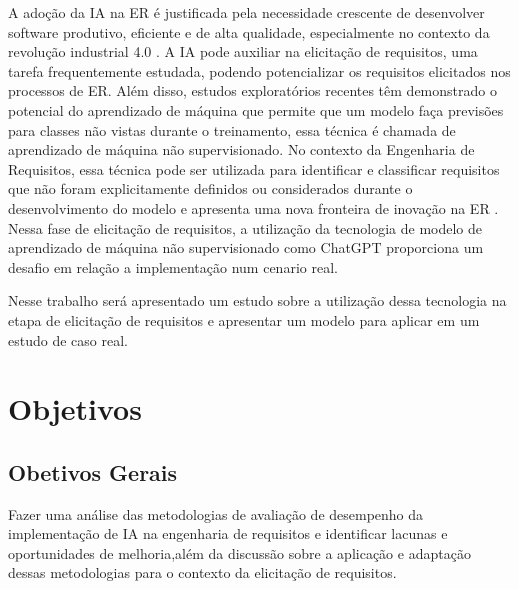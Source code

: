 A adoção da IA na ER é justificada pela necessidade crescente de desenvolver software produtivo, eficiente e de alta qualidade, especialmente no contexto da revolução industrial 4.0 \cite{sofian2022systematic}.
 A IA pode auxiliar na elicitação de requisitos, uma tarefa frequentemente estudada, podendo potencializar os requisitos elicitados nos processos de ER. Além disso, estudos exploratórios recentes têm demonstrado o potencial do aprendizado  de máquina que permite que um modelo faça previsões para classes não vistas durante o treinamento, essa técnica é chamada de aprendizado de máquina não supervisionado. No contexto da Engenharia de Requisitos, essa técnica pode ser utilizada para identificar e classificar requisitos que não foram explicitamente definidos ou considerados durante o desenvolvimento do modelo e apresenta uma nova fronteira de inovação na ER \cite{alhoshan2023zero}. Nessa fase de elicitação de requisitos, a utilização da tecnologia de modelo de aprendizado de máquina não supervisionado como ChatGPT proporciona um desafio em relação a implementação num cenario real. 
 



 Nesse trabalho será apresentado um estudo sobre a utilização dessa tecnologia na etapa de elicitação de requisitos e apresentar um modelo para aplicar em um estudo de caso real.

 \section{Objetivos}
\subsection{Obetivos Gerais}

Fazer uma análise das metodologias de avaliação de desempenho da implementação de IA na engenharia de requisitos e identificar lacunas e oportunidades de melhoria,além da discussão sobre a aplicação e adaptação dessas metodologias para o contexto da elicitação de requisitos. 


